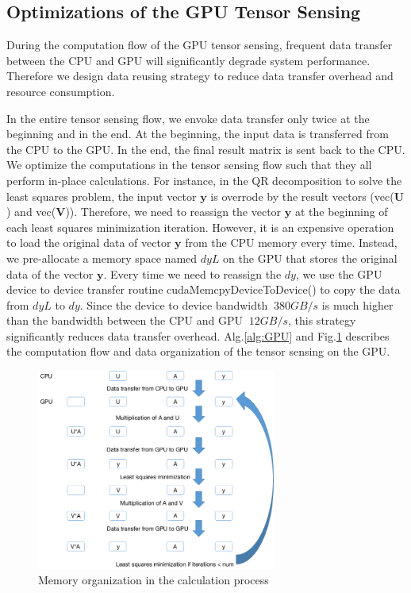 \documentclass[futureinternet,article,submit,moreauthors,pdftex,10pt,a4paper]{Definitions/mdpi}
\theoremstyle{plain}
\theoremstyle{definition}
\theoremstyle{remark}
\begin{document}
\subsection{Optimizations of the GPU Tensor Sensing}
\label{SEC_OPT}
During the computation flow of the GPU tensor sensing, frequent data transfer between the CPU and GPU will significantly degrade system performance. Therefore we design data reusing  strategy to reduce data transfer overhead and resource consumption.

In the entire tensor sensing flow, we envoke data transfer only twice at the beginning and in the end. At the beginning, the input data is transferred from the CPU to the GPU. In the end, the final result matrix is sent back to the CPU. We optimize the computations in the tensor sensing flow such that they all perform in-place calculations. For instance, in the QR decomposition to solve the least squares problem, the input vector $\mathbf{y}$ is overrode by the result vectors (vec($\mathbf{U}$) and  vec($\mathbf{V}$)). Therefore, we need to reassign the vector $\mathbf{y}$ at the beginning of each least squares minimization iteration. However, it is an expensive operation to load the original data of vector $\mathbf{y}$ from the CPU memory every time. Instead, we pre-allocate a memory space named  $dyL$ on the GPU that stores the original data of the vector $\mathbf{y}$. Every time we need to reassign the $dy$, we use the GPU device to device transfer routine cudaMemcpyDeviceToDevice() to copy the data from $dyL$ to $dy$. Since the device to device bandwidth $~380 GB/s$ is much higher than the bandwidth between the CPU and GPU $~12 GB/s$, this strategy significantly reduces data transfer overhead. Alg.\ref{alg:GPU} and Fig.\ref{Fig:dataTS} describes the computation flow and data organization of the tensor sensing on the GPU.

\begin{figure}[H]
\centering
\includegraphics[width=0.7\textwidth]{dataTS.png}
\caption{Memory organization in the calculation process}
\label{Fig:dataTS}
\end{figure}
\end{document}

